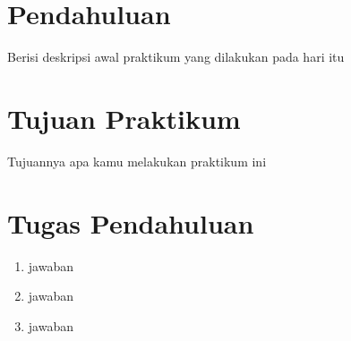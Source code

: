 \section{Pendahuluan}
Berisi deskripsi awal praktikum yang dilakukan pada hari itu
\section{Tujuan Praktikum}
Tujuannya apa kamu melakukan praktikum ini
\section{Tugas Pendahuluan}
\begin{center}
	\colorbox{cyan!30}{\parbox{0.8\linewidth}{
		\begin{enumerate}
		\item jawaban
		\item jawaban
		\item jawaban
	\end{enumerate}
	}}
\end{center}